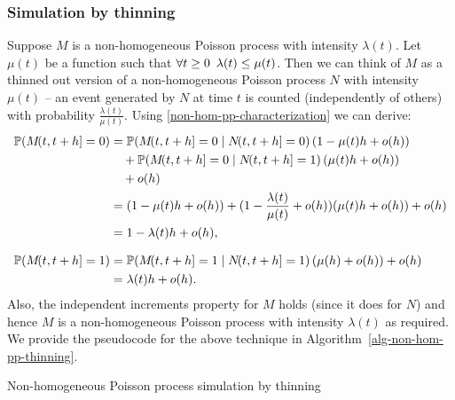 \documentclass[report.tex]{subfiles}
\begin{document}
\subsubsection{Simulation by thinning}

Suppose $M$ is a non-homogeneous Poisson process with intensity $\lambda(t)$.
Let $\mu(t)$ be a function such that
$\forall t \geq 0 \enskip \lambda(t) \leq \mu(t)$. Then we can think of
$M$ as a thinned out version of a non-homogeneous Poisson process $N$ with
intensity $\mu(t)$ --
an event generated by $N$ at time $t$ is counted (independently of others)
with probability $\frac{\lambda(t)}{\mu(t)}$.
Using \ref{non-hom-pp-characterization} we can derive:
\begin{equation*}
\begin{split}
\pr{\countingProcess{M}{t}{t+h} = 0}
&= \cpr{\countingProcess{M}{t}{t+h} = 0}{\countingProcess{N}{t}{t+h} = 0}
   (1 - \mu(t)h + o(h)) \\
   &\quad+ \cpr{\countingProcess{M}{t}{t+h} = 0}{\countingProcess{N}{t}{t+h} = 1}
   (\mu(t)h + o(h)) \\
   &\quad+ o(h) \\
&= (1 - \mu(t)h + o(h)) + (1 - \frac{\lambda(t)}{\mu(t)} + o(h))
   (\mu(t)h + o(h)) + o(h) \\
   &= 1 - \lambda(t)h + o(h), \\[0.75em]
\pr{\countingProcess{M}{t}{t+h} = 1}
&= \cpr{\countingProcess{M}{t}{t+h} = 1}{\countingProcess{N}{t}{t+h} = 1}
   (\mu(h) + o(h)) + o(h) \\
&= \lambda(t)h + o(h).
\end{split}
\end{equation*}
Also, the independent increments property for $M$ holds (since it does for $N$) and
hence $M$ is a non-homogeneous Poisson process with intensity $\lambda(t)$ as required.
We provide the pseudocode for the above technique in
Algorithm~\ref{alg-non-hom-pp-thinning}.

\begin{algorithm}
\caption{Non-homogeneous Poisson process simulation by thinning}
\label{alg-non-hom-pp-thinning}
\begin{algorithmic}
    \EndWhile
  \EndFor
\end{algorithmic}
\end{algorithm}
\end{document}
